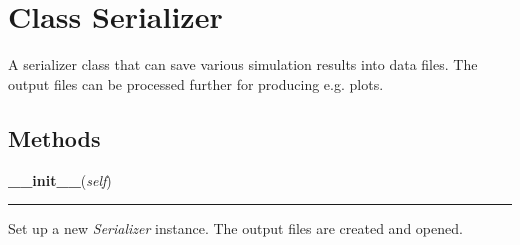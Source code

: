 
\section{Class Serializer}

    \label{Serializer:Serializer}
A serializer class that can save various simulation results into data
files. The output files can be processed further for producing e.g. plots.



  \subsection{Methods}

    \label{Serializer:Serializer:__init__}

    \vspace{0.5ex}

\hspace{.8\funcindent}\begin{boxedminipage}{\funcwidth}

    \raggedright \textbf{\_\_init\_\_}(\textit{self})

    \vspace{-1.5ex}

    \rule{\textwidth}{0.5\fboxrule}
\setlength{\parskip}{2ex}
    Set up a new \textit{Serializer} instance. The output files are created
    and opened.

\setlength{\parskip}{1ex}
    \end{boxedminipage}

    \label{Serializer:Serializer:set_interval}

    \vspace{0.5ex}

